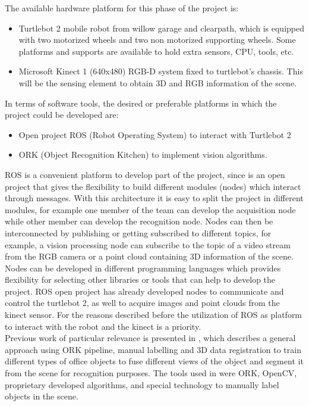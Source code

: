 \documentclass[fontsize=12pt]{article}
\begin{document}
The available hardware platform for this phase of the project is:
\begin{itemize}
\item Turtlebot 2 mobile robot from willow garage and clearpath, which is equipped with two motorized wheels and two non motorized supporting wheels. Some platforms and supports are available to hold extra sensors, CPU, tools, etc. 
\item Microsoft Kinect  1 (640x480) RGB-D system fixed to turtlebot's chassis. This will be the sensing element to obtain 3D and RGB information of the scene. 
\end{itemize}
In terms of software tools, the desired or preferable platforms  in which the project could be developed are:
\begin{itemize}
\item Open project ROS (Robot Operating System) to interact with Turtlebot 2 \cite{bib:ROS} 
\item ORK (Object Recognition Kitchen)\cite{bib:ORK} to implement vision algorithms. 
\end{itemize}
ROS is a convenient platform to develop part of the project, since is an open project that gives the flexibility to build different modules (nodes) which interact through messages. With this architecture it is easy to split the project in different modules, for example one member of the team can develop the acquisition node while other member can develop the recognition node. Nodes can then be interconnected  by publishing or getting subscribed to different topics, for example, a vision processing node can subscribe to the topic of a video stream from the RGB camera or a point cloud containing 3D information of the scene. Nodes can be developed in different programming languages which provides flexibility for selecting other libraries or tools that can help to develop the project. ROS open project has already developed nodes to communicate and control the turtlebot 2, as well to  acquire images and point clouds from the kinect sensor. 
For the reasons described before the utilization of ROS  as platform to interact with the robot and the kinect is a priority.\\

Previous work of particular relevance is presented in \cite{bib:semantic}, which describes a general approach using ORK pipeline, manual labelling and 3D data registration to train different types of office objects to fuse different views of the object and segment it from the scene for recognition purposes. The tools used in \cite{bib:semantic} were ORK, OpenCV, proprietary developed algorithms, and special technology to manually label objects in the scene. \\
\end{document}

